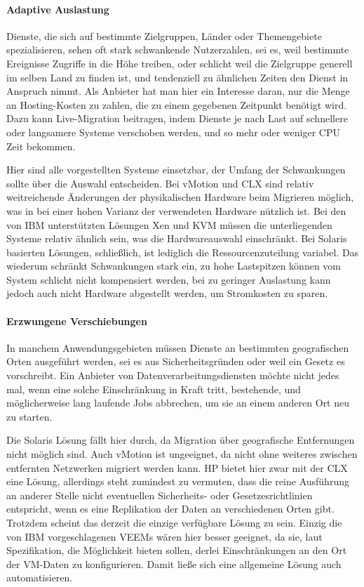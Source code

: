 \paragraph{Adaptive Auslastung}
Dienste, die sich auf bestimmte Zielgruppen, Länder oder Themengebiete
spezialisieren, sehen oft stark schwankende Nutzerzahlen, sei es, weil
bestimmte Ereignisse Zugriffe in die Höhe treiben, oder schlicht weil
die Zielgruppe generell im selben Land zu finden ist, und tendenziell
zu ähnlichen Zeiten den Dienst in Anspruch nimmt. Als Anbieter hat man
hier ein Interesse daran, nur die Menge an Hosting-Kosten zu zahlen,
die zu einem gegebenen Zeitpunkt benötigt wird. Dazu kann
Live-Migration beitragen, indem Dienste je nach Last auf schnellere
oder langsamere Systeme verschoben werden, und so mehr oder weniger
CPU Zeit bekommen.

Hier sind alle vorgestellten Systeme einsetzbar, der Umfang der
Schwankungen sollte über die Auswahl entscheiden. Bei vMotion und
\ac{CLX} sind relativ weitreichende Änderungen der physikalischen
Hardware beim Migrieren möglich, was in bei einer hohen Varianz der
verwendeten Hardware nützlich ist. Bei den von IBM unterstützten
Lösungen Xen und \ac{KVM} müssen die unterliegenden Systeme relativ
ähnlich sein, was die Hardwareauswahl einschränkt. Bei Solaris
basierten Lösungen, schließlich, ist lediglich die Ressourcenzuteilung
variabel. Das wiederum schränkt Schwankungen stark ein, zu hohe
Lastspitzen können vom System schlicht nicht kompensiert werden, bei
zu geringer Auslastung kann jedoch auch nicht Hardware abgestellt
werden, um Stromkosten zu sparen.

\paragraph{Erzwungene Verschiebungen}
In manchem Anwendungsgebieten müssen Dienste an bestimmten
geografischen Orten ausgeführt werden, sei es aus Sicherheitsgründen
oder weil ein Gesetz es vorschreibt. Ein Anbieter von
Datenverarbeitungsdiensten möchte nicht jedes mal, wenn eine solche
Einschränkung in Kraft tritt, bestehende, und möglicherweise lang
laufende Jobs abbrechen, um sie an einem anderen Ort neu zu starten.

Die Solaris Lösung fällt hier durch, da Migration über geografische
Entfernungen nicht möglich sind. Auch vMotion ist ungeeignet, da nicht
ohne weiteres zwischen entfernten Netzwerken migriert werden kann. HP
bietet hier zwar mit der \ac{CLX} eine Lösung, allerdings steht
zumindest zu vermuten, dass die reine Ausführung an anderer Stelle
nicht eventuellen Sicherheits- oder Gesetzesrichtlinien entspricht,
wenn es eine Replikation der Daten an verschiedenen Orten
gibt. Trotzdem scheint das derzeit die einzige verfügbare Lösung zu
sein.  Einzig die von IBM vorgeschlagenen \acp{VEEM} wären hier besser
geeignet, da sie, laut Spezifikation, die Möglichkeit bieten sollen,
derlei Einschränkungen an den Ort der VM-Daten zu konfigurieren. Damit
ließe sich eine allgemeine Lösung auch automatisieren.

